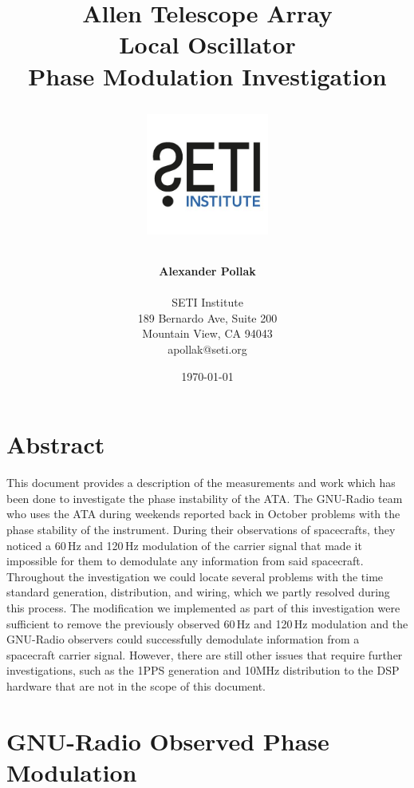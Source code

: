 \documentclass[12pt]{article}
\title{\Huge Allen Telescope Array\\
\vspace{0.5cm}
Local Oscillator\\Phase Modulation Investigation\\
\vspace{1.5cm} %
\normalsize \emph{}
\vspace{1cm} %
\begin{center}
\includegraphics[height=4cm]{titlepage/SETI_institute_logo.jpg}
\end{center}
}
\author{ 

\textbf{ Alexander Pollak} \\
\vspace{1cm}


SETI Institute \\ 
189 Bernardo Ave, Suite 200 \\
Mountain View, CA 94043 \\ 
apollak@seti.org\\
}
\date{\today}
\begin{document}
\clearpage\maketitle
\thispagestyle{empty}

\newpage
\thispagestyle{empty}
\section*{Abstract}

This document provides a description of the measurements and work which has been done to investigate the phase instability of the ATA. The GNU-Radio team who uses the ATA during weekends reported back in October problems with the phase stability of the instrument. 
During their observations of spacecrafts, they noticed a 60\,Hz and 120\,Hz modulation of the carrier signal that made it impossible for them to demodulate any information from said spacecraft. Throughout the investigation we could locate several problems with the time standard generation, distribution, and wiring, which we partly resolved during this process. The modification we implemented as part of this investigation were sufficient to remove the previously observed 60\,Hz and 120\,Hz modulation and the GNU-Radio observers could successfully demodulate information from a spacecraft carrier signal. However, there are still other issues that require further investigations, such as the 1PPS generation and 10MHz distribution to the DSP hardware that are not in the scope of this document.








\noindent 
%



%

\newpage
\thispagestyle{empty}
\tableofcontents
\newpage

\section{GNU-Radio Observed Phase Modulation}
\label{sec:1}
\end{document}
